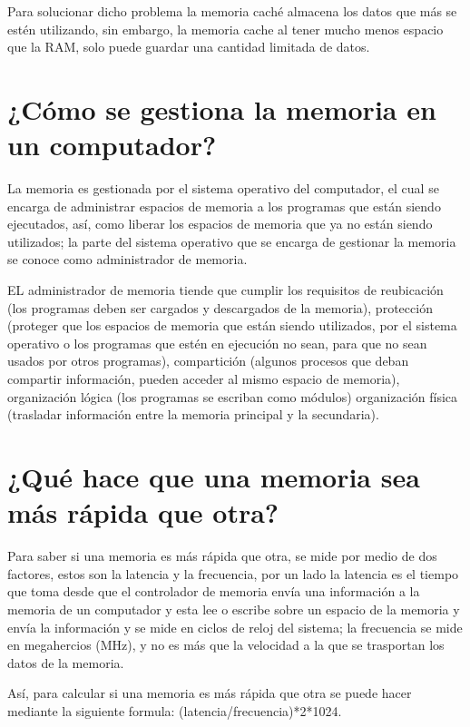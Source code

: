 \documentclass{article}
\begin{document}
Para solucionar dicho problema la memoria caché almacena los datos que más se estén utilizando, sin embargo, la memoria cache al tener mucho menos espacio que la RAM, solo puede guardar una cantidad limitada de datos.\cite{Salazar}

\section{¿Cómo se gestiona la memoria en un computador?}
La memoria es gestionada por el sistema operativo del computador, el cual se encarga de administrar espacios de memoria a los programas que están siendo ejecutados, así, como liberar los espacios de memoria que ya no están siendo utilizados; la parte del sistema operativo que se encarga de gestionar la memoria se conoce como administrador de memoria.
\vspace{0.5cm}

EL administrador de memoria tiende que cumplir los requisitos de reubicación (los programas deben ser cargados y descargados de la memoria), protección (proteger que los espacios de memoria que están siendo utilizados, por el sistema operativo o los programas que estén en ejecución no sean, para que no sean usados por otros programas), compartición (algunos procesos que deban compartir información, pueden acceder al mismo espacio de memoria), organización lógica (los programas se escriban como módulos) organización física (trasladar información entre la memoria principal y la secundaria).\cite{aguilera2015sistemas} 

\section{¿Qué hace que una memoria sea más rápida que otra?}
Para saber si una memoria es más rápida que otra, se mide por medio de dos factores, estos son la latencia y la frecuencia, por un lado la latencia es el tiempo que toma desde que el controlador de memoria envía una información  a la memoria de un computador y esta lee o escribe sobre un espacio de la memoria y envía la información y se mide en ciclos de reloj del sistema\cite{Salazar}; la frecuencia se mide en megahercios (MHz), y no es más que la velocidad a la que se trasportan los datos de la memoria.\cite{computerhoy}
\vspace{0.5cm}

Así, para calcular si una memoria es más rápida que otra se puede hacer mediante la siguiente formula: (latencia/frecuencia)*2*1024.\cite{computerhoy}



\end{document}
